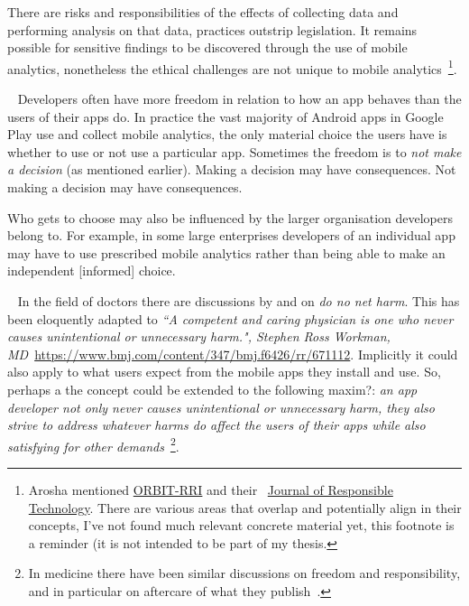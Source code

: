 There are risks and responsibilities of the effects of collecting data and performing analysis on that data, practices outstrip legislation. It remains possible for sensitive findings to be discovered through the use of mobile analytics, nonetheless the ethical challenges are not unique to mobile analytics~\footnote{Arosha mentioned \href{https://www.orbit-rri.org/}{ORBIT-RRI} and their ~\href{https://www.journals.elsevier.com/journal-of-responsible-technology}{Journal of Responsible Technology}. There are various areas that overlap and potentially align in their concepts, I've not found much relevant concrete material yet, this footnote is a reminder (it is not intended to be part of my thesis.}.

~\label{newthought-freedom-and-responsibility}
Developers often have more freedom in relation to how an app behaves than the users of their apps do. In practice the vast majority of Android apps in Google Play use and collect mobile analytics, the only material choice the users have is whether to use or not use a particular app. Sometimes the freedom is to \emph{not make a decision} (as mentioned earlier). Making a decision may have consequences. Not making a decision may have consequences. 

Who gets to choose may also be influenced by the larger organisation developers belong to. For example, in some large enterprises developers of an individual app may have to use prescribed mobile analytics rather than being able to make an independent [informed] choice.


~\label{newthought-do-no-net-harm}
In the field of doctors there are discussions by \citealt{Schuenemann2011_guidelines2_0_do_no_net_harm} and \citealt{Sokolf6426_2013_first_do_no_harm_revisited} on \emph{do no net harm}. This has been eloquently adapted to \emph{``A competent and caring physician is one who never causes unintentional or unnecessary harm.", Stephen Ross Workman, MD}~\url{https://www.bmj.com/content/347/bmj.f6426/rr/671112}. Implicitly it could also apply to what users expect from the mobile apps they install and use. So, perhaps a the concept could be extended to the following maxim?: \emph{an app developer not only never causes unintentional or unnecessary harm, they also strive to address whatever harms do affect the users of their apps while also satisfying for other demands}~\footnote{In medicine there have been similar discussions on freedom and responsibility, and in particular on aftercare of what they publish~\citep{rennie1998_freedom_and_responsibility_in_medical_publication}.}.

